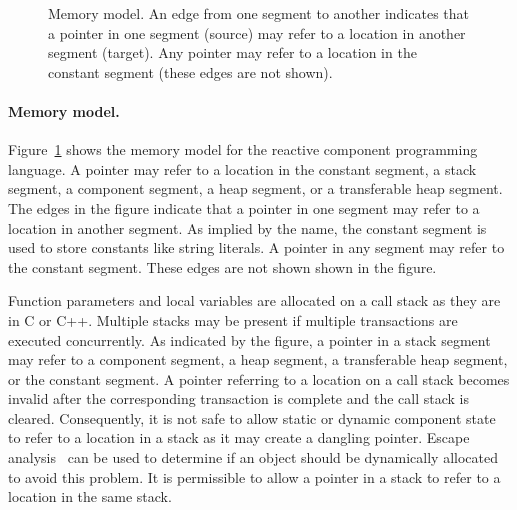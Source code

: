 \begin{figure}
{
}%
\caption{Memory model.
An edge from one segment to another indicates that a pointer in one segment (source) may refer to a location in another segment (target).
Any pointer may refer to a location in the constant segment (these edges are not shown).}
\label{memory_model}
\end{figure}

\paragraph{Memory model.}
Figure~\ref{memory_model} shows the memory model for the reactive component programming language.
A pointer may refer to a location in the constant segment, a stack segment, a component segment, a heap segment, or a transferable heap segment.
The edges in the figure indicate that a pointer in one segment may refer to a location in another segment.
As implied by the name, the constant segment is used to store constants like string literals.
A pointer in any segment may refer to the constant segment.
These edges are not shown shown in the figure.

Function parameters and local variables are allocated on a call stack as they are in C or C++.
Multiple stacks may be present if multiple transactions are executed concurrently.
As indicated by the figure, a pointer in a stack segment may refer to a component segment, a heap segment, a transferable heap segment, or the constant segment.
A pointer referring to a location on a call stack becomes invalid after the corresponding transaction is complete and the call stack is cleared.
Consequently, it is not safe to allow static or dynamic component state to refer to a location in a stack as it may create a dangling pointer.
Escape analysis~\cite{Park:1992:EAL:143095.143125} can be used to determine if an object should be dynamically allocated to avoid this problem.
It is permissible to allow a pointer in a stack to refer to a location in the same stack.

